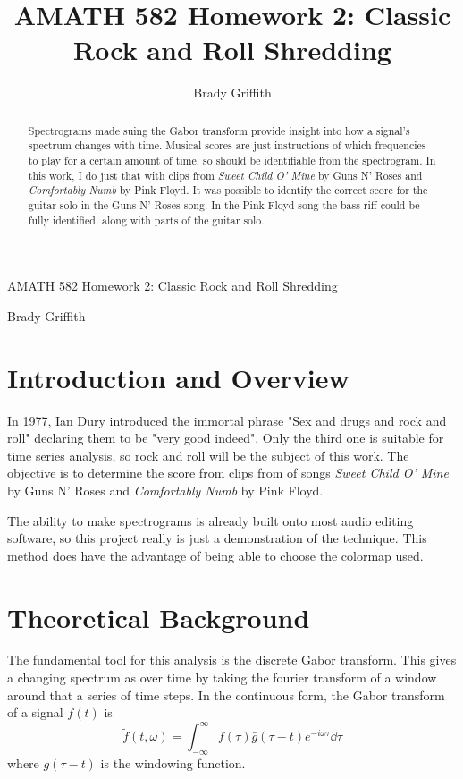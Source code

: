 \documentclass{article}
\title{AMATH 582 Homework 2: Classic Rock and Roll Shredding}
\author{Brady Griffith}
\begin{document}
    \begin{center}
        \Large AMATH 582 Homework 2: Classic Rock and Roll Shredding \par
        \large Brady Griffith
    \end{center}

    \begin{abstract}
        Spectrograms made suing the Gabor transform provide insight into how a signal's spectrum changes with time. Musical scores are just instructions of which frequencies to play for a certain amount of time, so should be identifiable from the spectrogram. In this work, I do just that with clips from \textit{Sweet Child O' Mine} by Guns N' Roses and \textit{Comfortably Numb} by Pink Floyd. It was possible to identify the correct score for the guitar solo in the Guns N' Roses song. In the Pink Floyd song the bass riff could be fully identified, along with parts of the guitar solo.
    \end{abstract}

    \section{Introduction and Overview}
    In 1977, Ian Dury introduced the immortal phrase "Sex and drugs and rock and roll" declaring them to be "very good indeed". Only the third one is suitable for time series analysis, so rock and roll will be the subject of this work. The objective is to determine the score from clips from of songs \textit{Sweet Child O' Mine} by Guns N' Roses and \textit{Comfortably Numb} by Pink Floyd.

    The ability to make spectrograms is already built onto most audio editing software, so this project really is just a demonstration of the technique. This method does have the advantage of being able to choose the colormap used.

    \section{Theoretical Background}
    The fundamental tool for this analysis is the discrete Gabor transform. This gives a changing spectrum as over time by taking the fourier transform of a window around that a series of time steps. In the continuous form, the Gabor transform of a signal $f(t)$ is
    \begin{equation}
        \tilde{f}(t, \omega) = \int_{-\infty}^{\infty} f(\tau)\bar{g}(\tau  - t) e^{- i \omega \tau} \dd{\tau}
    \end{equation}
    where $g(\tau - t)$ is the windowing function.
\end{document}
